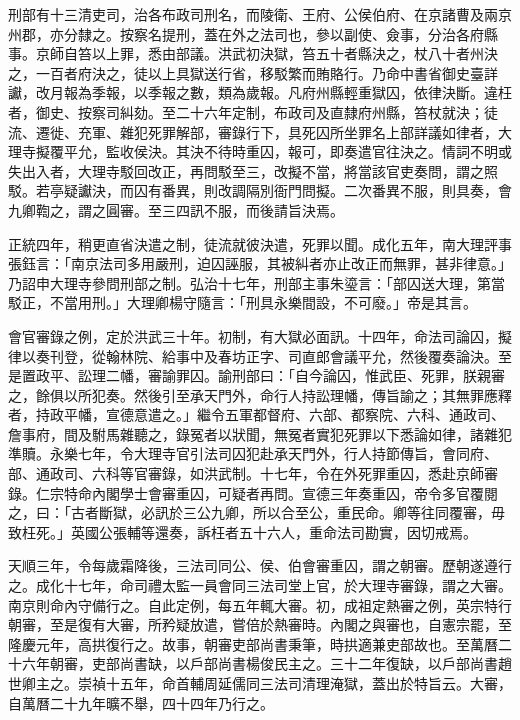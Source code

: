 刑部有十三清吏司，治各布政司刑名，而陵衛、王府、公侯伯府、在京諸曹及兩京州郡，亦分隸之。按察名提刑，蓋在外之法司也，參以副使、僉事，分治各府縣事。京師自笞以上罪，悉由部議。洪武初決獄，笞五十者縣決之，杖八十者州決之，一百者府決之，徒以上具獄送行省，移駁繁而賄賂行。乃命中書省御史臺詳讞，改月報為季報，以季報之數，類為歲報。凡府州縣輕重獄囚，依律決斷。違枉者，御史、按察司糾劾。至二十六年定制，布政司及直隸府州縣，笞杖就決；徒流、遷徙、充軍、雜犯死罪解部，審錄行下，具死囚所坐罪名上部詳議如律者，大理寺擬覆平允，監收侯決。其決不待時重囚，報可，即奏遣官往決之。情詞不明或失出入者，大理寺駁回改正，再問駁至三，改擬不當，將當該官吏奏問，謂之照駁。若亭疑讞決，而囚有番異，則改調隔別衙門問擬。二次番異不服，則具奏，會九卿鞫之，謂之圓審。至三四訊不服，而後請旨決焉。

正統四年，稍更直省決遣之制，徒流就彼決遣，死罪以聞。成化五年，南大理評事張鈺言：「南京法司多用嚴刑，迫囚誣服，其被糾者亦止改正而無罪，甚非律意。」乃詔申大理寺參問刑部之制。弘治十七年，刑部主事朱瑬言：「部囚送大理，第當駁正，不當用刑。」大理卿楊守隨言：「刑具永樂間設，不可廢。」帝是其言。

會官審錄之例，定於洪武三十年。初制，有大獄必面訊。十四年，命法司論囚，擬律以奏刊登，從翰林院、給事中及春坊正字、司直郎會議平允，然後覆奏論決。至是置政平、訟理二幡，審諭罪囚。諭刑部曰：「自今論囚，惟武臣、死罪，朕親審之，餘俱以所犯奏。然後引至承天門外，命行人持訟理幡，傳旨諭之；其無罪應釋者，持政平幡，宣德意遣之。」繼令五軍都督府、六部、都察院、六科、通政司、詹事府，間及駙馬雜聽之，錄冤者以狀聞，無冤者實犯死罪以下悉論如律，諸雜犯準贖。永樂七年，令大理寺官引法司囚犯赴承天門外，行人持節傳旨，會同府、部、通政司、六科等官審錄，如洪武制。十七年，令在外死罪重囚，悉赴京師審錄。仁宗特命內閣學士會審重囚，可疑者再問。宣德三年奏重囚，帝令多官覆閱之，曰：「古者斷獄，必訊於三公九卿，所以合至公，重民命。卿等往同覆審，毋致枉死。」英國公張輔等還奏，訴枉者五十六人，重命法司勘實，因切戒焉。

天順三年，令每歲霜降後，三法司同公、侯、伯會審重囚，謂之朝審。歷朝遂遵行之。成化十七年，命司禮太監一員會同三法司堂上官，於大理寺審錄，謂之大審。南京則命內守備行之。自此定例，每五年輒大審。初，成祖定熱審之例，英宗特行朝審，至是復有大審，所矜疑放遣，嘗倍於熱審時。內閣之與審也，自憲宗罷，至隆慶元年，高拱復行之。故事，朝審吏部尚書秉筆，時拱適兼吏部故也。至萬曆二十六年朝審，吏部尚書缺，以戶部尚書楊俊民主之。三十二年復缺，以戶部尚書趙世卿主之。崇禎十五年，命首輔周延儒同三法司清理淹獄，蓋出於特旨云。大審，自萬曆二十九年曠不舉，四十四年乃行之。

